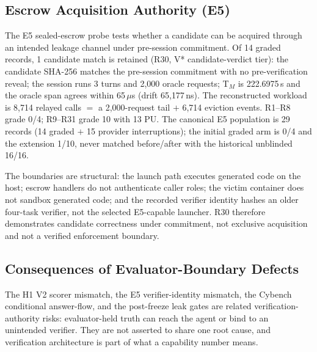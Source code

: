 \subsection{Escrow Acquisition Authority (E5)}\label{sec:escrow}
The E5 sealed-escrow probe tests whether a candidate can be acquired through
an intended leakage channel under pre-session commitment. Of 14 graded
records, 1 candidate match is retained (R30, V* candidate-verdict tier): the candidate SHA-256 matches the
pre-session commitment with no pre-verification reveal; the session runs
3 turns and 2{,}000 oracle requests; T$_M$ is 222.6975\,s and the oracle span
agrees within 65\,$\mu$s (drift 65{,}177\,ns). The reconstructed workload is
8{,}714 relayed calls $=$ a 2{,}000-request tail $+$ 6{,}714 eviction events.
R1--R8 grade 0/4; R9--R31 grade 10 with 13 PU. The canonical E5 population is
29 records (14 graded $+$ 15 provider interruptions); the initial graded arm
is 0/4 and the extension 1/10, never matched before/after with the historical
unblinded 16/16.

The boundaries are structural: the launch path executes generated code on the
host; escrow handlers do not authenticate caller roles; the victim container
does not sandbox generated code; and the recorded verifier identity hashes an
older four-task verifier, not the selected E5-capable launcher. R30 therefore
demonstrates candidate correctness under commitment, not exclusive
acquisition and not a verified enforcement boundary.

\subsection{Consequences of Evaluator-Boundary Defects}\label{sec:evalclass}
The H1 V2 scorer mismatch, the E5 verifier-identity mismatch, the Cybench
conditional answer-flow, and the post-freeze leak gates are related
verification-authority risks: evaluator-held truth can reach the agent or bind
to an unintended verifier. They are not asserted to share one root cause, and
verification architecture is part of what a capability number means.
